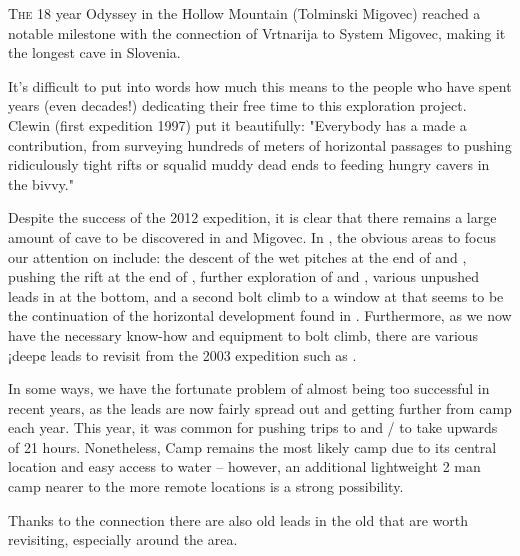 \thispagestyle{endchapter}

\begin{tcolorbox}
\vspace{80pt}

\lettrine{T}{he} 18 year Odyssey in the Hollow Mountain (Tolminski Migovec) reached a notable milestone with the connection of Vrtnarija to System Migovec, making it the longest cave in Slovenia.

It's difficult to put into words how much this means to the people who have spent years (even decades!) dedicating their free time to this exploration project. Clewin (first expedition 1997) put it beautifully: "Everybody has a made a contribution, from surveying hundreds of meters of horizontal passages to pushing ridiculously tight rifts or squalid muddy dead ends to feeding hungry cavers in the bivvy."

Despite the success of the 2012 expedition, it is clear that there
remains a large amount of cave to be discovered in  and
Migovec. In , the obvious areas to focus our attention
on include: the descent of the wet pitches at the end of  and , pushing the rift at the end of , further exploration of  and ,
various unpushed leads in  at the bottom, and a
second bolt climb to a window at  that seems to
be the continuation of the horizontal development found in .
Furthermore, as we now have the necessary know-how and equipment to bolt
climb, there are various ¡deep¢ leads to revisit from the 2003
expedition such as .

In some ways, we have the fortunate problem of almost being too
successful in recent years, as the leads are now fairly spread out and
getting further from camp each year. This year, it was common for
pushing trips to  and
/ to take upwards of 21 hours.
Nonetheless, Camp  remains the most likely camp due to its
central location and easy access to water -- however, an additional
lightweight 2 man camp nearer to the more remote locations is a strong
possibility.

Thanks to the connection there are also old leads in the old  that
are worth revisiting, especially around the  area.





\end{tcolorbox}
\BgThispage